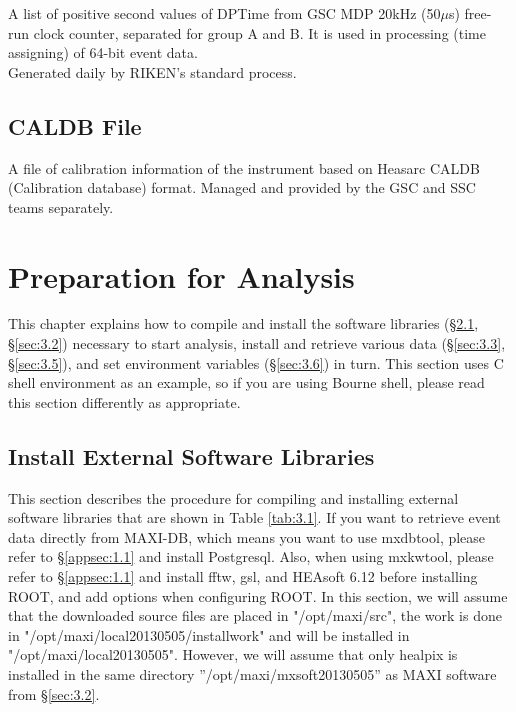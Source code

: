 \documentclass[10pt]{report}
\renewcommand{\_}{\textscale{.5}{\textbf{\textunderscore}}}
\begin{document}
A list of positive second values of DPTime from GSC MDP 20kHz (50$\mu$s) free-run clock counter, separated for group A and B. It is used in processing (time assigning) of 64-bit event data. \\
\indent Generated daily by RIKEN's standard process. \\

\section{CALDB File}\label{sec:2.4}

A file of calibration information of the instrument based on Heasarc CALDB (Calibration database) format. Managed and provided by the GSC and SSC teams separately. \\

\clearpage

\chapter{Preparation for Analysis}\label{ch:3}

This chapter explains how to compile and install the software libraries (\S\ref{sec:3.1}, \S\ref{sec:3.2}) necessary to start analysis, install and retrieve various data (\S\ref{sec:3.3}, \S\ref{sec:3.5}), and set environment variables (\S\ref{sec:3.6}) in turn. This section uses C shell environment as an example, so if you are using Bourne shell, please read this section differently as appropriate.\\

\section{Install External Software Libraries}\label{sec:3.1}

This section describes the procedure for compiling and installing external software libraries that are shown in Table \ref{tab:3.1}. If you want to retrieve event data directly from MAXI-DB, which means you want to use mxdbtool, please refer to \S \ref{appsec:1.1} and install Postgresql. Also, when using mxkwtool, please refer to \S \ref{appsec:1.1} and install fftw, gsl, and HEAsoft 6.12 before installing ROOT, and add options when configuring ROOT. In this section, we will assume that the downloaded source files are placed in "/opt/maxi/src", the work is done in "/opt/maxi/local\_20130505/install\_work" and will be installed in "/opt/maxi/local\_20130505". However, we will assume that only healpix is installed in the same directory ”/opt/maxi/mxsoft\_20130505” as MAXI software from \S\ref{sec:3.2}.\\
\end{document}
